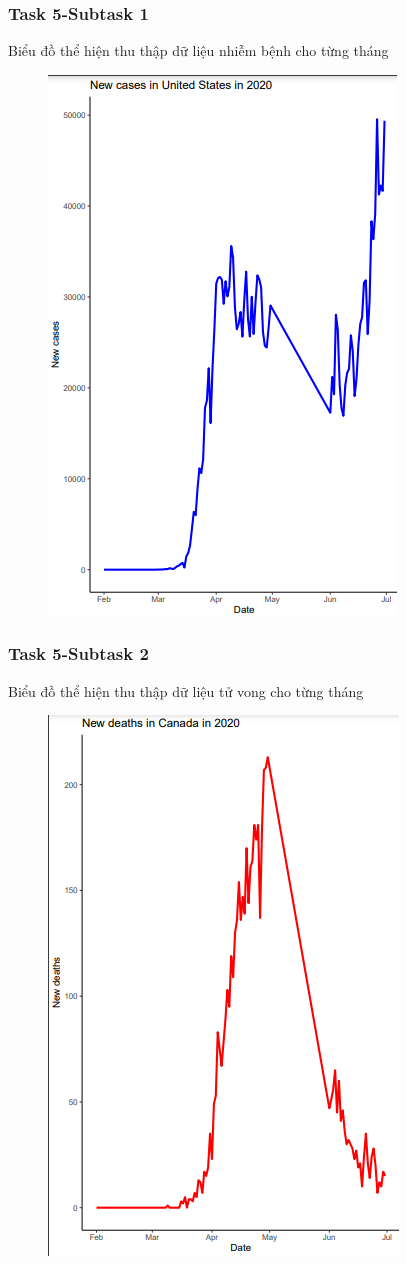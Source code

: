 \documentclass[english,10pt,table]{beamer}
\begin{document}
\frame
{
    \frametitle{Task 5-Subtask 1}
    \begin{block}{Biểu đồ thể hiện thu thập dữ liệu nhiễm bệnh cho từng tháng}
    \begin{figure}[H]
		\centering
	    \includegraphics[scale=0.5]{images/5.1.2.png}
	\end{figure}
    \end{block}
}
\frame
{
    \frametitle{Task 5-Subtask 2}
    \begin{block}{Biểu đồ thể hiện thu thập dữ liệu tử vong cho từng tháng}
    \begin{figure}[H]
		\centering
		\includegraphics[scale=0.5]{images/5.2.1.png}
	\end{figure}
    \end{block}
}
\end{document}
